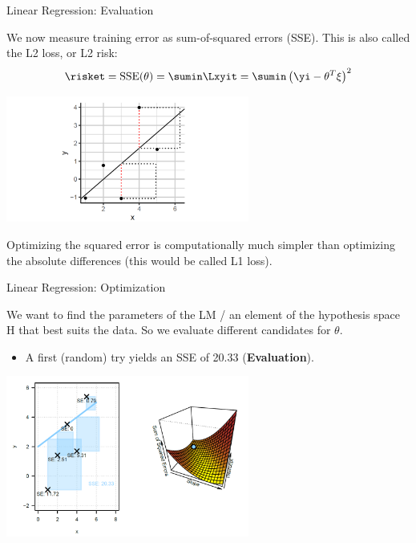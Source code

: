 
\begin{frame}{Linear Regression: Evaluation}

We now measure training error as sum-of-squared errors (SSE). This is also
called the L2 loss, or L2 risk: \[
\risket = \operatorname{SSE}(\theta) = \sumin \Lxyit = \sumin \left(\yi - \theta^T \xi\right)^2
\]

\scriptsize

\begin{center}
\includegraphics[width=0.6\textwidth]{plots/lin-reg.png}
\end{center}


\normalsize  \vspace{-0.4cm} Optimizing the squared error is
computationally much simpler than optimizing the absolute differences
(this would be called L1 loss).

\end{frame}


\begin{frame}{Linear Regression: Optimization}

We want to find the parameters of the LM / an element of the hypothesis
space H that best suits the data. So we evaluate different candidates
for \(\theta\).

\begin{itemize}
\item
  A first (random) try yields an SSE of 20.33 (\textbf{Evaluation}).
\end{itemize}

\begin{center}
\includegraphics[width=0.6\textwidth]{plots/lin-reg-optim01.png}
\end{center}


\end{frame}



